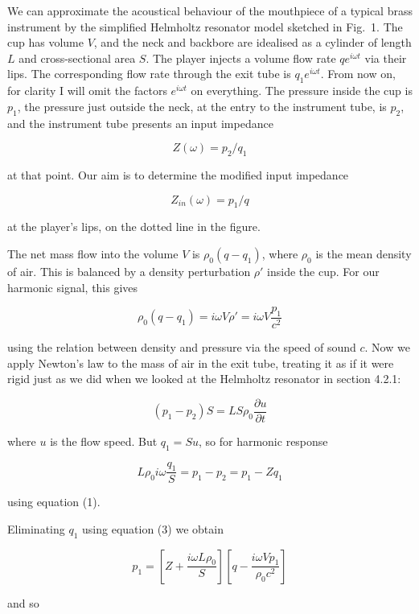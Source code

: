   We can approximate the acoustical behaviour of the mouthpiece of a typical 
  brass instrument by the simplified Helmholtz resonator model sketched in 
  Fig.\ 1. The cup has volume $V$, and the neck and backbore are idealised as a 
  cylinder of length $L$ and cross-sectional area $S$. The player injects a 
  volume flow rate $qe^{i \omega t}$ via their lips. The corresponding flow 
  rate through the exit tube is $q_1e^{i \omega t}$. From now on, for clarity I 
  will omit the factors $e^{i \omega t}$ on everything. The pressure inside the 
  cup is $p_1$, the pressure just outside the neck, at the entry to the 
  instrument tube, is $p_2$, and the instrument tube presents an input 
  impedance 

  $$Z(\omega)=p_2/q_1 \tag{1}$$ 

  at that point. Our aim is to determine the modified input impedance 

  $$Z_{in}(\omega)=p_1/q \tag{2}$$ 

  at the player's lips, on the dotted line in the figure. 


  The net mass flow into the volume $V$ is $\rho_0 (q-q_1)$, where $\rho_0$ is 
  the mean density of air. This is balanced by a density perturbation $\rho'$ 
  inside the cup. For our harmonic signal, this gives 

  $$\rho_0(q-q_1)=i \omega V \rho' = i \omega V \dfrac{p_1}{c^2} \tag{3}$$ 

  using the relation between density and pressure via the speed of sound $c$. 
  Now we apply Newton's law to the mass of air in the exit tube, treating it as 
  if it were rigid just as we did when we looked at the Helmholtz resonator in 
  section 4.2.1: 

  $$(p_1-p_2) S = L S \rho_0 \dfrac{\partial u}{\partial t} \tag{4}$$ 

  where $u$ is the flow speed. But $q_1 = Su$, so for harmonic response 

  $$L \rho_0 i \omega \dfrac{q_1}{S}=p_1-p_2 = p_1 -Zq_1 \tag{5}$$ 

  using equation (1). 

  Eliminating $q_1$ using equation (3) we obtain 

  $$p_1=\left[ Z+\dfrac{i \omega L \rho_0}{S} \right] \left[ q-\dfrac{i \omega 
  V p_1}{\rho_0 c^2} \right] \tag{6}$$ 

  and so 


